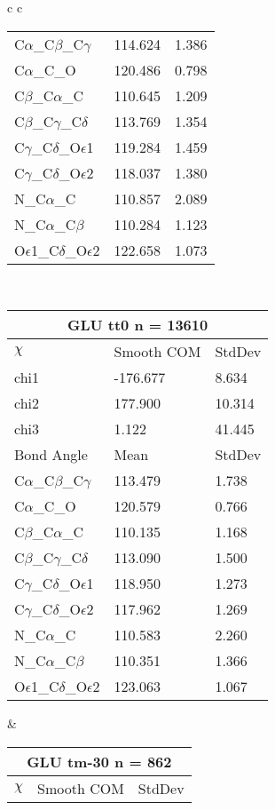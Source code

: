 \begin{longtable}{ c c }
\begin{tabular}{ l l l }
  C$\alpha$\_C$\beta$\_C$\gamma$ & 114.624 & 1.386\\
  C$\alpha$\_C\_O & 120.486 & 0.798\\
  C$\beta$\_C$\alpha$\_C & 110.645 & 1.209\\
  C$\beta$\_C$\gamma$\_C$\delta$ & 113.769 & 1.354\\
  C$\gamma$\_C$\delta$\_O$\epsilon$1 & 119.284 & 1.459\\
  C$\gamma$\_C$\delta$\_O$\epsilon$2 & 118.037 & 1.380\\
  N\_C$\alpha$\_C & 110.857 & 2.089\\
  N\_C$\alpha$\_C$\beta$ & 110.284 & 1.123\\
  O$\epsilon$1\_C$\delta$\_O$\epsilon$2 & 122.658 & 1.073\\
  \bottomrule
  \end{tabular}
  \\
  \begin{tabular}{ l l l }
  \toprule
  \multicolumn{3}{c}{GLU \textbf{tt0} n = 13610} \\ \toprule
  $\chi$       & Smooth COM & StdDev \\ \midrule
  chi1 & -176.677 & 8.634 \\ 
  chi2 & 177.900 & 10.314 \\ 
  chi3 & 1.122 & 41.445 \\ \midrule
  Bond Angle   & Mean     & StdDev \\ \midrule
  C$\alpha$\_C$\beta$\_C$\gamma$ & 113.479 & 1.738\\
  C$\alpha$\_C\_O & 120.579 & 0.766\\
  C$\beta$\_C$\alpha$\_C & 110.135 & 1.168\\
  C$\beta$\_C$\gamma$\_C$\delta$ & 113.090 & 1.500\\
  C$\gamma$\_C$\delta$\_O$\epsilon$1 & 118.950 & 1.273\\
  C$\gamma$\_C$\delta$\_O$\epsilon$2 & 117.962 & 1.269\\
  N\_C$\alpha$\_C & 110.583 & 2.260\\
  N\_C$\alpha$\_C$\beta$ & 110.351 & 1.366\\
  O$\epsilon$1\_C$\delta$\_O$\epsilon$2 & 123.063 & 1.067\\
  \bottomrule
  \end{tabular}
  &
  \begin{tabular}{ l l l }
  \toprule
  \multicolumn{3}{c}{GLU \textbf{tm-30} n = 862} \\ \toprule
  $\chi$       & Smooth COM & StdDev \\ \midrule

\end{tabular}
\end{longtable}
